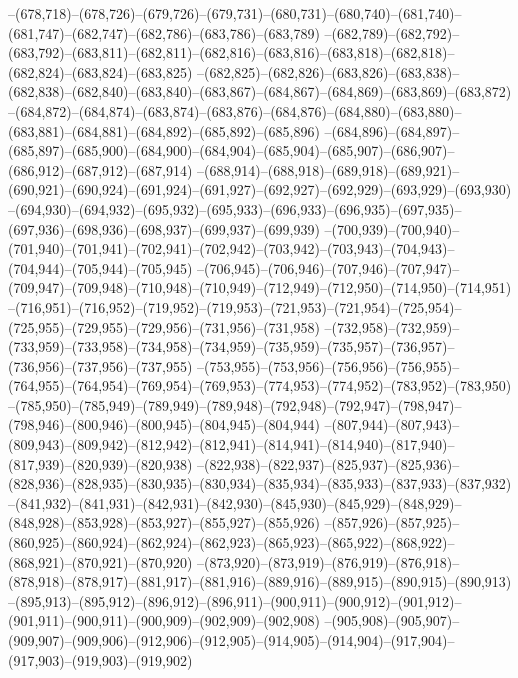 --(678,718)--(678,726)--(679,726)--(679,731)--(680,731)--(680,740)--(681,740)--(681,747)--(682,747)--(682,786)--(683,786)--(683,789)
--(682,789)--(682,792)--(683,792)--(683,811)--(682,811)--(682,816)--(683,816)--(683,818)--(682,818)--(682,824)--(683,824)--(683,825)
--(682,825)--(682,826)--(683,826)--(683,838)--(682,838)--(682,840)--(683,840)--(683,867)--(684,867)--(684,869)--(683,869)--(683,872)
--(684,872)--(684,874)--(683,874)--(683,876)--(684,876)--(684,880)--(683,880)--(683,881)--(684,881)--(684,892)--(685,892)--(685,896)
--(684,896)--(684,897)--(685,897)--(685,900)--(684,900)--(684,904)--(685,904)--(685,907)--(686,907)--(686,912)--(687,912)--(687,914)
--(688,914)--(688,918)--(689,918)--(689,921)--(690,921)--(690,924)--(691,924)--(691,927)--(692,927)--(692,929)--(693,929)--(693,930)
--(694,930)--(694,932)--(695,932)--(695,933)--(696,933)--(696,935)--(697,935)--(697,936)--(698,936)--(698,937)--(699,937)--(699,939)
--(700,939)--(700,940)--(701,940)--(701,941)--(702,941)--(702,942)--(703,942)--(703,943)--(704,943)--(704,944)--(705,944)--(705,945)
--(706,945)--(706,946)--(707,946)--(707,947)--(709,947)--(709,948)--(710,948)--(710,949)--(712,949)--(712,950)--(714,950)--(714,951)
--(716,951)--(716,952)--(719,952)--(719,953)--(721,953)--(721,954)--(725,954)--(725,955)--(729,955)--(729,956)--(731,956)--(731,958)
--(732,958)--(732,959)--(733,959)--(733,958)--(734,958)--(734,959)--(735,959)--(735,957)--(736,957)--(736,956)--(737,956)--(737,955)
--(753,955)--(753,956)--(756,956)--(756,955)--(764,955)--(764,954)--(769,954)--(769,953)--(774,953)--(774,952)--(783,952)--(783,950)
--(785,950)--(785,949)--(789,949)--(789,948)--(792,948)--(792,947)--(798,947)--(798,946)--(800,946)--(800,945)--(804,945)--(804,944)
--(807,944)--(807,943)--(809,943)--(809,942)--(812,942)--(812,941)--(814,941)--(814,940)--(817,940)--(817,939)--(820,939)--(820,938)
--(822,938)--(822,937)--(825,937)--(825,936)--(828,936)--(828,935)--(830,935)--(830,934)--(835,934)--(835,933)--(837,933)--(837,932)
--(841,932)--(841,931)--(842,931)--(842,930)--(845,930)--(845,929)--(848,929)--(848,928)--(853,928)--(853,927)--(855,927)--(855,926)
--(857,926)--(857,925)--(860,925)--(860,924)--(862,924)--(862,923)--(865,923)--(865,922)--(868,922)--(868,921)--(870,921)--(870,920)
--(873,920)--(873,919)--(876,919)--(876,918)--(878,918)--(878,917)--(881,917)--(881,916)--(889,916)--(889,915)--(890,915)--(890,913)
--(895,913)--(895,912)--(896,912)--(896,911)--(900,911)--(900,912)--(901,912)--(901,911)--(900,911)--(900,909)--(902,909)--(902,908)
--(905,908)--(905,907)--(909,907)--(909,906)--(912,906)--(912,905)--(914,905)--(914,904)--(917,904)--(917,903)--(919,903)--(919,902)

